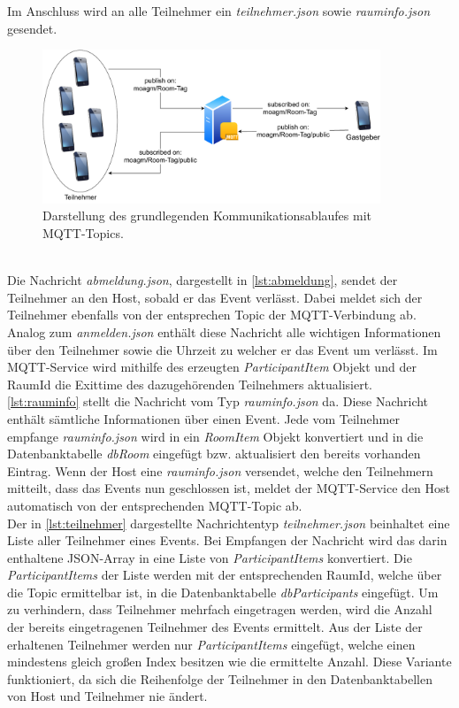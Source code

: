 Im Anschluss wird an alle Teilnehmer ein \textit{teilnehmer.json} sowie \textit{rauminfo.json} gesendet.
\begin{figure}
	\centering
	\includegraphics[width =0.9\textwidth]{images/mqttservice.pdf}
	\caption{Darstellung des grundlegenden Kommunikationsablaufes mit MQTT-Topics.}
	\label{img:mqtt}
\end{figure}
\\
Die Nachricht \textit{abmeldung.json}, dargestellt in \cref{lst:abmeldung},   sendet der Teilnehmer an den Host, sobald er das Event verlässt. 
Dabei meldet sich der Teilnehmer ebenfalls von der entsprechen Topic der MQTT-Verbindung ab. 
Analog zum \textit{anmelden.json} enthält diese Nachricht alle wichtigen Informationen über den Teilnehmer sowie die Uhrzeit zu welcher er das Event um verlässt. 
Im MQTT-Service wird mithilfe des erzeugten \textit{ParticipantItem} Objekt und der RaumId die Exittime des dazugehörenden Teilnehmers aktualisiert.  
\\
\cref{lst:rauminfo} stellt die Nachricht vom Typ \textit{rauminfo.json} da. 
Diese Nachricht enthält sämtliche Informationen über einen Event. 
Jede vom Teilnehmer empfange \textit{rauminfo.json} wird in ein \textit{RoomItem} Objekt konvertiert und in die Datenbanktabelle \textit{dbRoom} eingefügt bzw. aktualisiert den bereits vorhanden Eintrag. 
Wenn der Host eine \textit{rauminfo.json} versendet, welche den Teilnehmern mitteilt, dass das Events nun geschlossen ist, meldet der MQTT-Service den Host automatisch von der entsprechenden MQTT-Topic ab.
\\
Der in \cref{lst:teilnehmer} dargestellte Nachrichtentyp \textit{teilnehmer.json} beinhaltet eine Liste aller Teilnehmer eines Events. 
Bei Empfangen der Nachricht wird das darin enthaltene JSON-Array in eine Liste von \textit{ParticipantItems} konvertiert. 
Die \textit{ParticipantItems} der Liste werden mit der entsprechenden RaumId, welche über die Topic ermittelbar ist, in die Datenbanktabelle \textit{dbParticipants} eingefügt. 
Um zu verhindern, dass Teilnehmer mehrfach eingetragen werden, wird die Anzahl der bereits eingetragenen Teilnehmer des Events ermittelt. 
Aus der Liste der erhaltenen Teilnehmer werden nur \textit{ParticipantItems} eingefügt, welche einen mindestens gleich großen Index besitzen wie die ermittelte Anzahl. 
Diese Variante funktioniert, da sich die Reihenfolge der Teilnehmer in den Datenbanktabellen von Host und Teilnehmer nie ändert.


